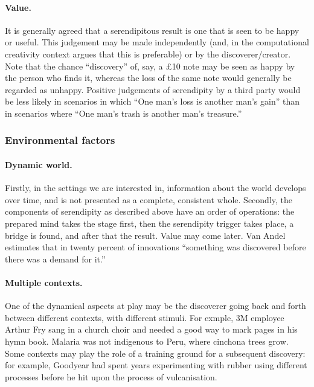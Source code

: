 \paragraph{Value.}

It is generally agreed that a serendipitous result is one that is seen
to be happy or useful.
%
This judgement may be made independently (and, in the computational
creativity context \cite{jordanous:12} argues that this is
preferable) or by the discoverer/creator.  Note that the chance
``discovery'' of, say, a \pounds 10 note may be seen as happy by the
person who finds it, whereas the loss of the same note would generally
be regarded as unhappy.  Positive judgements of serendipity by a third
party would be less likely in scenarios in which ``One man's loss is
another man's gain'' than in scenarios where ``One man's trash is
another man's treasure.''

\subsubsection*{Environmental factors}

\paragraph{Dynamic world.}

Firstly, in the settings we are interested in, information about the
world develops over time, and is not presented as a complete,
consistent whole.
%
Secondly, the components of serendipity as described above have an
order of operations: the prepared mind takes the stage first, then the
serendipity trigger takes place, a bridge is found, and after that the
result.  Value may come later.  Van Andel
\citeyear[p. 643]{van1994anatomy} estimates that in twenty percent of
innovations ``something was discovered before there was a demand for
it.''

\paragraph{Multiple contexts.}

One of the dynamical aspects at play may be the discoverer going back
and forth between different contexts, with different stimuli.
%
For exmple, 3M employee Arthur Fry sang in a church choir and needed a
good way to mark pages in his hymn book.  Malaria was not indigenous
to Peru, where cinchona trees grow.  Some contexts may play the role
of a training ground for a subsequent discovery: for example, Goodyear
had spent years experimenting with rubber using different processes
before he hit upon the process of vulcanisation.

